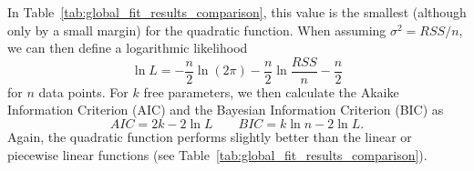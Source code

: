 \documentclass[fleqn,usenatbib]{mnras}
\begin{document}
In Table~\ref{tab:global_fit_results_comparison}, this value is the smallest (although only by a small margin) for the quadratic function. When assuming $\sigma^2 = RSS / n$, we can then define a logarithmic likelihood
\begin{equation}
    \ln L = - \frac{n}{2} \ln (2 \pi) - \frac{n}{2} \ln \frac{RSS}{n} - \frac{n}{2}
\end{equation}
for $n$ data points. For $k$ free parameters, we then calculate the Akaike Information Criterion (AIC) and the Bayesian Information Criterion (BIC) as
\begin{equation} \label{eq:aic_bic}
    AIC = 2 k  - 2 \ln L \qquad BIC = k \ln n - 2 \ln L.
\end{equation}
Again, the quadratic function performs slightly better than the linear or piecewise linear functions (see Table~\ref{tab:global_fit_results_comparison}).


\end{document}
